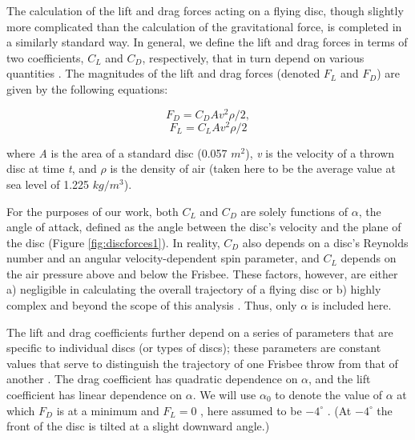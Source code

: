 \documentclass[a4paper,12pt, oneside]{article}
\begin{document}
The calculation of the lift and drag forces acting on a flying disc, though slightly more complicated than the calculation of the gravitational force, is completed in a similarly standard way. In general, we define the lift and drag forces in terms of two coefficients, $C_L$ and $C_D$, respectively, that in turn depend on various quantities \cite{H3}. The magnitudes of the lift and drag forces (denoted $F_L$ and $F_D$) are given by the following equations:

\begin{equation}
  F_D=C_DAv^2\rho/2,
\end{equation}
\begin{equation}
  F_L=C_LAv^2\rho/2
\end{equation}

where \textit{A} is the area of a standard disc (0.057 $m^2$), \textit{v} is the velocity of a thrown disc at time \textit{t}, and $\rho$ is the density of air (taken here to be the average value at sea level of 1.225 $kg/m^3$). 

For the purposes of our work, both $C_L$ and $C_D$ are solely functions of $\alpha$, the angle of attack, defined as the angle between the disc's velocity and the plane of the disc (Figure \ref{fig:discforces1}). In reality, $C_D$ also depends on a disc's Reynolds number and an angular velocity-dependent spin parameter, and $C_L$ depends on the air pressure above and below the Frisbee. These factors, however, are either a) negligible in calculating the overall trajectory of a flying disc or b) highly complex and beyond the scope of this analysis \cite{H3}. Thus, only $\alpha$ is included here.

The lift and drag coefficients further depend on a series of parameters that are specific to individual discs (or types of discs); these parameters are constant values that serve to distinguish the trajectory of one Frisbee throw from that of another \cite{hubbardandhummel}.  The drag coefficient has quadratic dependence on $\alpha$, and the lift coefficient has linear dependence on $\alpha$. We will use $\alpha_0$ to denote the value of $\alpha$ at which $F_D$ is at a minimum and $F_L=0$ , here assumed to be $-4^{\circ}$ \cite{H3}. (At $-4^{\circ}$ the front of the disc is tilted at a slight downward angle.) 
\end{document}
